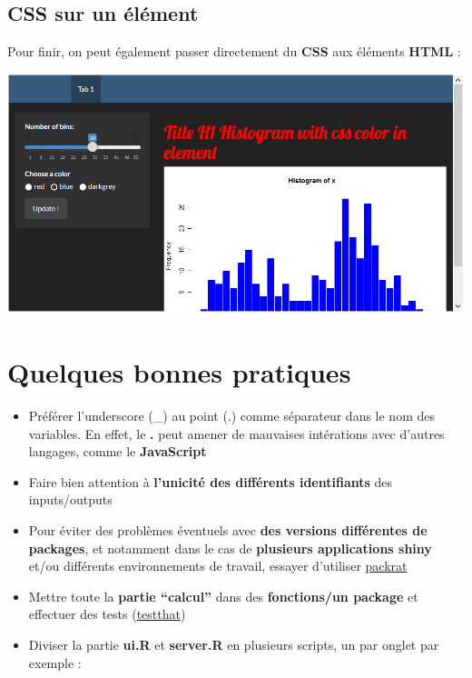 \documentclass[]{article}
\newenvironment{Shaded}{\begin{snugshade}}{\end{snugshade}}
\newcommand{\KeywordTok}[1]{\textcolor[rgb]{0.13,0.29,0.53}{\textbf{#1}}}
\newcommand{\DataTypeTok}[1]{\textcolor[rgb]{0.13,0.29,0.53}{#1}}
\newcommand{\StringTok}[1]{\textcolor[rgb]{0.31,0.60,0.02}{#1}}
\newcommand{\CommentTok}[1]{\textcolor[rgb]{0.56,0.35,0.01}{\textit{#1}}}
\newcommand{\ErrorTok}[1]{\textcolor[rgb]{0.64,0.00,0.00}{\textbf{#1}}}
\newcommand{\NormalTok}[1]{#1}
\providecommand{\tightlist}{%
  \setlength{\itemsep}{0pt}\setlength{\parskip}{0pt}}
\begin{document}
\subsection{CSS sur un élément}\label{css-sur-un-element}

Pour finir, on peut également passer directement du \textbf{CSS} aux
éléments \textbf{HTML} :

\begin{Shaded}
\end{Shaded}

\includegraphics{img/css3.png}

\section{Quelques bonnes pratiques}\label{quelques-bonnes-pratiques}

\begin{itemize}
\tightlist
\item
  Préférer l'underscore (\_) au point (.) comme séparateur dans le nom
  des variables. En effet, le \textbf{.} peut amener de mauvaises
  intérations avec d'autres langages, comme le \textbf{JavaScript}
\item
  Faire bien attention à \textbf{l'unicité des différents identifiants}
  des inputs/outputs
\item
  Pour éviter des problèmes éventuels avec \textbf{des versions
  différentes de packages}, et notamment dans le cas de
  \textbf{plusieurs applications shiny} et/ou différents environnements
  de travail, essayer d'utiliser
  \href{https://rstudio.github.io/packrat/}{packrat}
\item
  Mettre toute la \textbf{partie ``calcul''} dans des
  \textbf{fonctions/un package} et effectuer des tests
  (\href{http://r-pkgs.had.co.nz/tests.html}{testthat})
\item
  Diviser la partie \textbf{ui.R} et \textbf{server.R} en plusieurs
  scripts, un par onglet par exemple :
\end{itemize}
\end{document}
